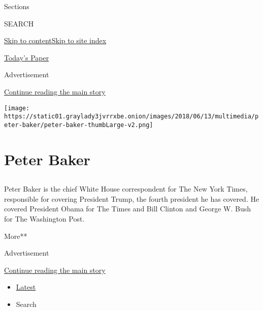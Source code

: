 Sections

SEARCH

\protect\hyperlink{site-content}{Skip to
content}\protect\hyperlink{site-index}{Skip to site index}

\href{https://myaccount.nytimes3xbfgragh.onion/auth/login?response_type=cookie\&client_id=vi}{}

\href{https://www.nytimes3xbfgragh.onion/section/todayspaper}{Today's
Paper}

Advertisement

\protect\hyperlink{after-top}{Continue reading the main story}

\texttt{[image: https://static01.graylady3jvrrxbe.onion/images/2018/06/13/multimedia/peter-baker/peter-baker-thumbLarge-v2.png]}

\hypertarget{peter-baker}{%
\section{Peter Baker}\label{peter-baker}}

\subsection{}

Peter Baker is the chief White House correspondent for The New York
Times, responsible for covering President Trump, the fourth president he
has covered. He covered President Obama for The Times and Bill Clinton
and George W. Bush for The Washington Post.

More**

Advertisement

\protect\hyperlink{after-mid1}{Continue reading the main story}

\begin{itemize}
\tightlist
\item
  \protect\hyperlink{stream-panel}{Latest}
\item
  Search
\end{itemize}

